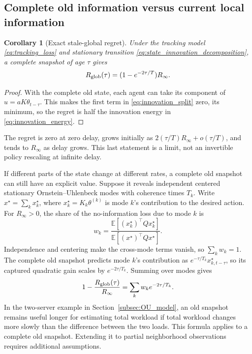 \documentclass[11pt]{article}
\newtheorem{corollary}{Corollary}
\begin{document}
\subsection{Complete old information versus current local information}
\label{subsec:two_architectures}

\begin{corollary}[Exact stale-global regret]
\label{thm:OU_stale_regret}
Under the tracking model \eqref{eq:tracking_loss} and stationary transition
\eqref{eq:state_innovation_decomposition}, a complete snapshot of age $\tau$ gives
\begin{equation}
R_{\rm glob}(\tau)=(1-e^{-2\tau/T})R_\infty.
\label{eq:OU_exact_regret}
\end{equation}
\end{corollary}
\begin{proof}
With the complete old state, each agent can take its component of
$u=aK\theta_{t-\tau}$. This makes the first term in
\eqref{eq:innovation_split} zero, its minimum, so the regret is half
the innovation energy in \eqref{eq:innovation_energy}.
\end{proof}
The regret is zero at
zero delay, grows initially as $2(\tau/T)R_\infty+o(\tau/T)$, and tends to
$R_\infty$ as delay grows. This last statement is a limit, not an invertible
policy rescaling at infinite delay.

If different parts of the state change at different rates, a complete
old snapshot can still have an explicit value. Suppose it reveals
independent centered stationary Ornstein--Uhlenbeck modes with coherence times
$T_k$. Write $x^\star=\sum_k x_k^\star$, where $x_k^\star=K_k\theta^{(k)}$
is mode $k$'s contribution to the desired action. For $R_\infty>0$,
the share of the no-information loss due to mode $k$ is
\[
w_k=\frac{\mathbb E[(x_k^\star)^\top Q x_k^\star]}
         {\mathbb E[(x^\star)^\top Q x^\star]}.
\]
Independence and centering make the cross-mode terms vanish, so $\sum_k w_k=1$.
The complete old snapshot predicts mode $k$'s contribution as
$e^{-\tau/T_k}x_{k,t-\tau}^\star$, so its captured quadratic gain scales by
$e^{-2\tau/T_k}$. Summing over modes gives
\[
1-\frac{R_{\rm glob}(\tau)}{R_\infty}
=\sum_k w_k e^{-2\tau/T_k}.
\]
In the two-server example in Section~\ref{subsec:OU_model}, an old snapshot
remains useful longer for estimating total workload if total workload
changes more slowly than the difference between the two loads. This formula
applies to a complete old snapshot. Extending it to partial neighborhood
observations requires additional assumptions.
\end{document}
